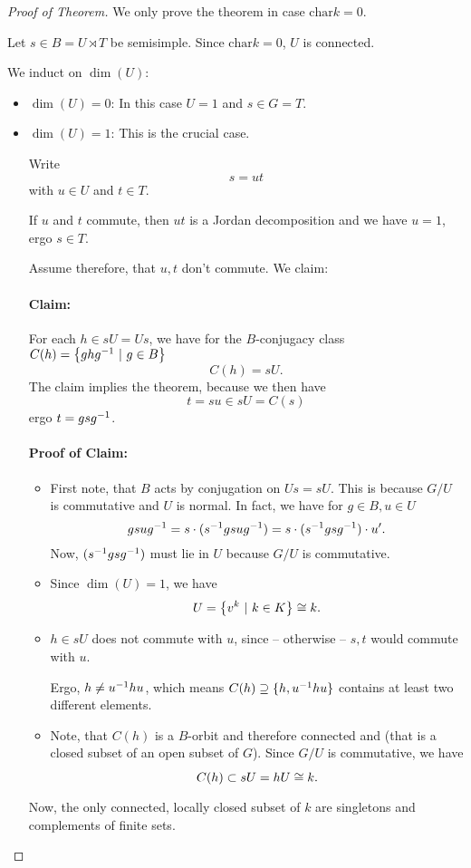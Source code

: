 \begin{proof}[Proof of Theorem]
	We only prove the theorem in case $\mathrm{char} k = 0$.
	
	Let $s \in B = U\rtimes T$ be semisimple. Since $\mathrm{char} k = 0$, $U$ is connected.
	
	We induct on $\dim(U)$:
	\begin{itemize}
		\item $\dim(U) = 0$: In this case $U = 1$ and $s \in G= T$.
		\item $\dim(U) = 1$: This is the crucial case.
		
		Write
		\[ s=ut \]
		with $u \in U$ and $t \in T$.
		
		If $u$ and $t$ commute, then $ut$ is a Jordan decomposition and we have $u = 1$, ergo $s \in T$.
		
		Assume therefore, that $u,t$ don't commute. We claim:
		
		\paragraph{Claim:} For each $h \in sU = Us$, we have for the $B$-conjugacy class $C(h) = \left\lbrace ghg^{-1} ~ | ~ g \in B\right\rbrace$
		\[ C(h) = sU. \]
		The claim implies the theorem, because we then have
		\[ t = su \in sU = C(s) \]
		ergo $t = gsg^{-1}$.
		
		\paragraph{Proof of Claim:}	
		\begin{itemize}
			\item First note, that $B$ acts by conjugation on $Us = sU$. This is because $G/U$ is commutative and $U$ is normal. In fact, we have for $g \in B, u \in U$
			\[ gsug^{-1} = s \cdot (s^{-1} g sug^{-1}) = s \cdot (s^{-1} g s g^{-1}) \cdot u'. \]
			Now, $(s^{-1} g s g^{-1})$ must lie in $U$ because $G/U$ is commutative.
			\item Since $\dim(U) = 1$, we have 
			\[ U = \left\lbrace v^k ~ | ~ k \in K\right\rbrace \overset{}{\cong} k. \]
			\item $h \in sU$ does not commute with $u$, since -- otherwise -- $s,t$ would commute with $u$.
			
			Ergo, $h \neq u^{-1} h u$, which means $C(h) \supseteq \{h, u^{-1} h u\}$ contains at least two different elements.
			\item Note, that $C(h)$ is a $B$-orbit and therefore connected and  (that is a closed subset of an open subset of $G$). Since $G/U$ is commutative, we have
			\[ C(h) \subset sU = hU \overset{}{\cong} k. \]
		\end{itemize}	
		Now, the only connected, locally closed subset of $k$ are singletons and complements of finite sets.
		

\end{itemize}
\end{proof}
